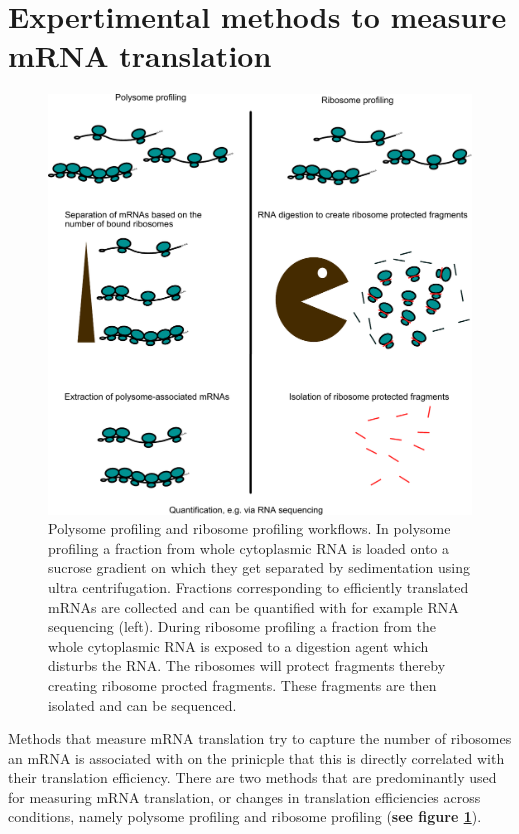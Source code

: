 \documentclass[12pt,openany]{book}
\begin{document}
\section{Expertimental methods to measure mRNA translation} \label{exptMethod}\begin{figure}
    \includegraphics{./figures/polyRibo.pdf}
  \caption{Polysome profiling and ribosome profiling workflows. In polysome profiling a fraction from whole cytoplasmic RNA is loaded onto a sucrose gradient on which they get separated by sedimentation using ultra centrifugation. Fractions corresponding to efficiently translated mRNAs are collected and can be quantified with for example RNA sequencing (left). During ribosome profiling a fraction from the whole cytoplasmic RNA is exposed to a digestion agent which disturbs the RNA. The ribosomes will protect fragments thereby creating ribosome procted fragments. These fragments are then isolated and can be sequenced.  \label{fig:polyRibo}}
\end{figure}

Methods that measure mRNA translation try to capture the number of
ribosomes an mRNA is associated with on the prinicple that this is
directly correlated with their translation efficiency. There are two
methods that are predominantly used for measuring mRNA translation, or
changes in translation efficiencies across conditions, namely polysome
profiling and ribosome profiling (\textbf{see figure
\ref{fig:polyRibo}}).
\end{document}
